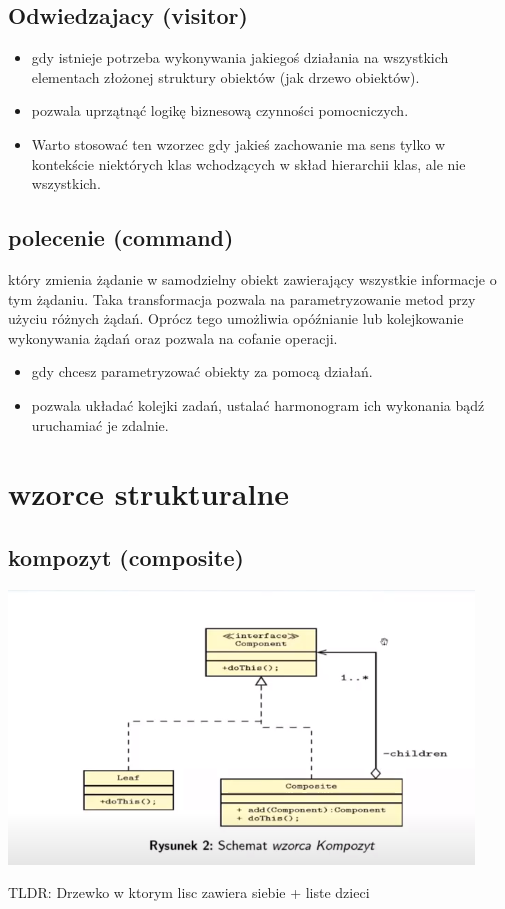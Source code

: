 \documentclass[11pt]{article}
\begin{document}
\subsection{Odwiedzajacy (visitor)}
\label{sec:orga52384d}
\begin{itemize}
\item gdy istnieje potrzeba wykonywania jakiegoś działania na wszystkich elementach złożonej struktury obiektów (jak drzewo obiektów).
\item pozwala uprzątnąć logikę biznesową czynności pomocniczych.
\item Warto stosować ten wzorzec gdy jakieś zachowanie ma sens tylko w kontekście niektórych klas wchodzących w skład hierarchii klas, ale nie wszystkich.
\end{itemize}
\subsection{polecenie (command)}
\label{sec:orgf77ad74}
który zmienia żądanie w samodzielny obiekt zawierający wszystkie informacje o tym żądaniu. Taka transformacja pozwala na parametryzowanie metod przy użyciu różnych żądań. Oprócz tego umożliwia opóźnianie lub kolejkowanie wykonywania żądań oraz pozwala na cofanie operacji.
\begin{itemize}
\item gdy chcesz parametryzować obiekty za pomocą działań.
\item pozwala układać kolejki zadań, ustalać harmonogram ich wykonania bądź uruchamiać je zdalnie.
\end{itemize}
\section{wzorce strukturalne}
\label{sec:org923d822}
\subsection{kompozyt (composite)}
\label{sec:orgee7ca34}
\begin{center}
\includegraphics[width=.9\linewidth]{./kompozyt.png}
\end{center}
TLDR: Drzewko w ktorym lisc zawiera siebie + liste dzieci
\end{document}
